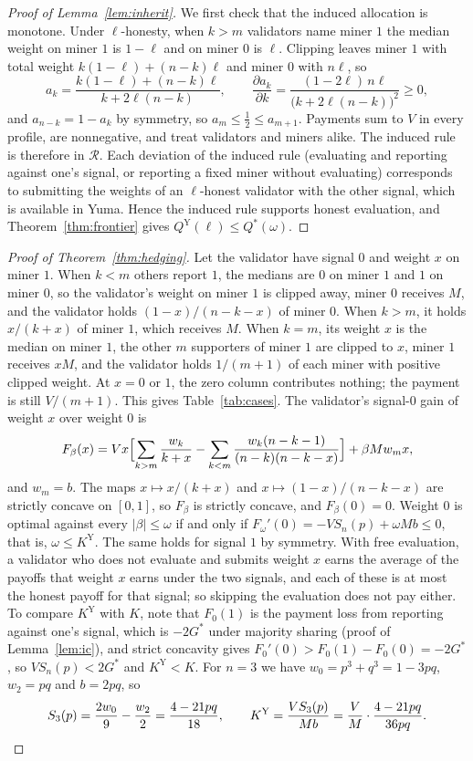\documentclass[sigconf,anonymous,review]{acmart}
\numberwithin{equation}{section}
\newcommand{\Gs}{G^{*}}
\newcommand{\KY}{K^{\mathrm{Y}}}
\newcommand{\QY}{Q^{\mathrm{Y}}}
\newcommand{\Rset}{\mathcal{R}}
\begin{document}
\begin{proof}[Proof of Lemma~\ref{lem:inherit}]
We first check that the induced allocation is monotone. Under $\ell$-honesty,
when $k>m$ validators name miner $1$ the median weight on
miner $1$ is $1-\ell$ and on miner $0$ is $\ell$. Clipping leaves miner $1$ with
total weight $k(1-\ell)+(n-k)\ell$ and miner $0$ with $n\ell$, so
\[
a_k=\frac{k(1-\ell)+(n-k)\ell}{k+2\ell(n-k)},\qquad
\frac{\partial a_k}{\partial k}=\frac{(1-2\ell)\,n\ell}{\bigl(k+2\ell(n-k)\bigr)^2}\ge0 ,
\]
and $a_{n-k}=1-a_k$ by symmetry, so $a_m\le\frac12\le a_{m+1}$. Payments sum to
$V$ in every profile, are nonnegative, and treat validators and miners alike.
The induced rule is therefore in $\Rset$. Each deviation of the induced rule
(evaluating and reporting against one's signal, or reporting a fixed miner
without evaluating) corresponds to submitting the weights of an
$\ell$-honest validator with the other signal, which is available in Yuma.
Hence the induced rule supports honest evaluation, and
Theorem~\ref{thm:frontier} gives $\QY(\ell)\le Q^*(\omega)$.
\end{proof}

\begin{proof}[Proof of Theorem~\ref{thm:hedging}]
Let the validator have signal $0$ and weight $x$ on miner $1$. When $k<m$
others report $1$, the medians are $0$ on miner $1$ and $1$ on miner $0$, so
the validator's weight on miner $1$ is clipped away, miner $0$ receives $M$,
and the validator holds $(1-x)/(n-k-x)$ of miner $0$. When $k>m$, it holds
$x/(k+x)$ of miner $1$, which receives $M$. When $k=m$, its weight $x$ is the
median on miner $1$, the other $m$ supporters of miner $1$ are clipped to $x$,
miner $1$ receives $xM$, and the validator holds $1/(m+1)$ of each miner
with positive clipped weight. At $x=0$ or $1$, the zero column contributes
nothing; the payment is still $V/(m+1)$. This gives Table~\ref{tab:cases}. The validator's signal-$0$ gain of weight $x$ over
weight $0$ is
\[
F_\beta(x)=Vx\Bigl[\sum_{k>m}\frac{w_k}{k+x}-\sum_{k<m}\frac{w_k(n-k-1)}{(n-k)(n-k-x)}\Bigr]+\beta Mw_mx,
\]
and $w_m=b$. The maps $x\mapsto x/(k+x)$ and $x\mapsto(1-x)/(n-k-x)$ are
strictly concave on $[0,1]$, so $F_\beta$ is strictly concave, and $F_\beta(0)=0$.
Weight $0$ is optimal against every $|\beta|\le\omega$ if and only if
$F_\omega'(0)=-VS_n(p)+\omega Mb\le0$, that is, $\omega\le\KY$. The same holds
for signal $1$ by symmetry. With free evaluation, a validator who does not
evaluate and submits weight $x$ earns the average of the payoffs that weight
$x$ earns under the two signals, and each of these is at most the honest payoff
for that signal; so skipping the evaluation does not pay either. To compare
$\KY$ with $K$, note that $F_0(1)$ is the payment loss from reporting against
one's signal, which is
$-2\Gs$ under majority sharing (proof of Lemma~\ref{lem:ic}), and strict
concavity gives $F_0'(0)>F_0(1)-F_0(0)=-2\Gs$, so $VS_n(p)<2\Gs$ and $\KY<K$.
For $n=3$ we have $w_0=p^3+q^3=1-3pq$, $w_2=pq$ and $b=2pq$, so
\[
S_3(p)=\frac{2w_0}{9}-\frac{w_2}{2}=\frac{4-21pq}{18},
\qquad
\KY=\frac{VS_3(p)}{Mb}=\frac VM\cdot\frac{4-21pq}{36pq}.
\qedhere
\]
\end{proof}
\end{document}
